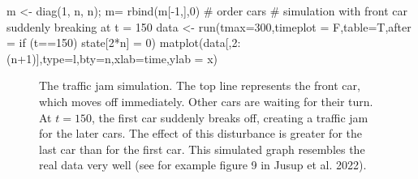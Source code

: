 \documentclass[
  a4paper,
  DIV=11,
  numbers=noendperiod,
  oneside]{scrreprt}
\newenvironment{Shaded}{}{}
\newcommand{\AttributeTok}[1]{\textcolor[rgb]{0.84,0.23,0.29}{#1}}
\newcommand{\CommentTok}[1]{\textcolor[rgb]{0.42,0.45,0.49}{#1}}
\newcommand{\DecValTok}[1]{\textcolor[rgb]{0.00,0.36,0.77}{#1}}
\newcommand{\FunctionTok}[1]{\textcolor[rgb]{0.44,0.26,0.76}{#1}}
\newcommand{\NormalTok}[1]{\textcolor[rgb]{0.14,0.16,0.18}{#1}}
\newcommand{\OtherTok}[1]{\textcolor[rgb]{0.44,0.26,0.76}{#1}}
\newcommand{\SpecialCharTok}[1]{\textcolor[rgb]{0.00,0.36,0.77}{#1}}
\newcommand{\StringTok}[1]{\textcolor[rgb]{0.01,0.18,0.38}{#1}}
\begin{document}
\begin{Shaded}
\begin{Highlighting}[]
\NormalTok{m }\OtherTok{\textless{}{-}} \FunctionTok{diag}\NormalTok{(}\DecValTok{1}\NormalTok{, n, n); m}\OtherTok{=} \FunctionTok{rbind}\NormalTok{(m[}\SpecialCharTok{{-}}\DecValTok{1}\NormalTok{,],}\DecValTok{0}\NormalTok{) }\CommentTok{\# order cars}
\CommentTok{\# simulation with front car suddenly breaking at t = 150}
\NormalTok{data }\OtherTok{\textless{}{-}} \FunctionTok{run}\NormalTok{(}\AttributeTok{tmax=}\DecValTok{300}\NormalTok{,}\AttributeTok{timeplot =}\NormalTok{ F,}\AttributeTok{table=}\NormalTok{T,}\AttributeTok{after =} \StringTok{\textquotesingle{}if (t==150) state[2*n] = 0\textquotesingle{}}\NormalTok{)}
\FunctionTok{matplot}\NormalTok{(data[,}\DecValTok{2}\SpecialCharTok{:}\NormalTok{(n}\SpecialCharTok{+}\DecValTok{1}\NormalTok{)],}\AttributeTok{type=}\StringTok{\textquotesingle{}l\textquotesingle{}}\NormalTok{,}\AttributeTok{bty=}\StringTok{\textquotesingle{}n\textquotesingle{}}\NormalTok{,}\AttributeTok{xlab=}\StringTok{\textquotesingle{}time\textquotesingle{}}\NormalTok{,}\AttributeTok{ylab =} \StringTok{\textquotesingle{}x\textquotesingle{}}\NormalTok{)}
\end{Highlighting}
\end{Shaded}

\begin{figure}


\caption{\label{fig-ch4n-img6-old-54}The traffic jam simulation. The top
line represents the front car, which moves off immediately. Other cars
are waiting for their turn. At \(t = 150\), the first car suddenly
breaks off, creating a traffic jam for the later cars. The effect of
this disturbance is greater for the last car than for the first car.
This simulated graph resembles the real data very well (see for example
figure 9 in Jusup et al. 2022).}

\end{figure}%
\end{document}
